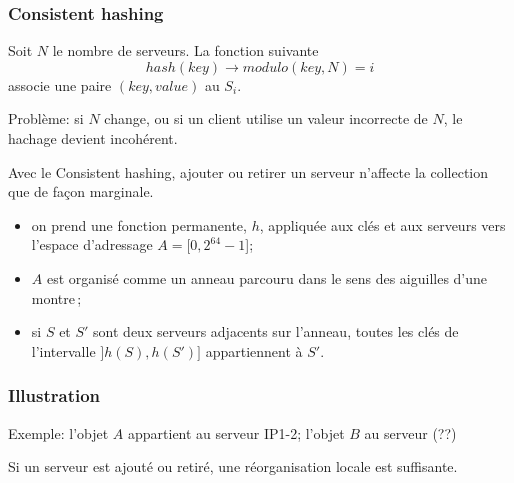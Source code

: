 \begin{frame}
\frametitle{Consistent hashing}

Soit $N$ le nombre de serveurs. La fonction suivante 
$$hash(key) \to modulo (key, N) = i$$
associe une paire $(key, value)$ au $S_i$.

\vfill

\alert{Problème}: si $N$ change, ou si un client utilise un valeur incorrecte de $N$, le hachage devient
\alert{incohérent}.

\vfill

Avec le  \alert{Consistent hashing}, ajouter ou retirer un serveur n'affecte la collection
que de façon \alert{marginale}.

\begin{itemize}
  \item on prend une fonction \alert{permanente}, $h$, appliquée aux clés \alert{et} aux serveurs
          vers l'espace d'adressage  $A=[0, 2^{64}-1$];
  \item $A$ est organisé comme un anneau parcouru dans le sens des aiguilles d'une montre\,;
  \item si $S$ et $S'$ sont deux serveurs adjacents sur l'anneau, toutes les clés de l'intervalle 
   $]h(S), h(S')]$ appartiennent à $S'$.
\end{itemize}
\end{frame}


\begin{frame}
\frametitle{Illustration}

Exemple: l'objet $A$ appartient au serveur IP1-2; l'objet $B$ au serveur (??)  

\vfill


\vfill

Si un serveur est ajouté ou retiré, une réorganisation \alert{locale} est suffisante.

\end{frame}


